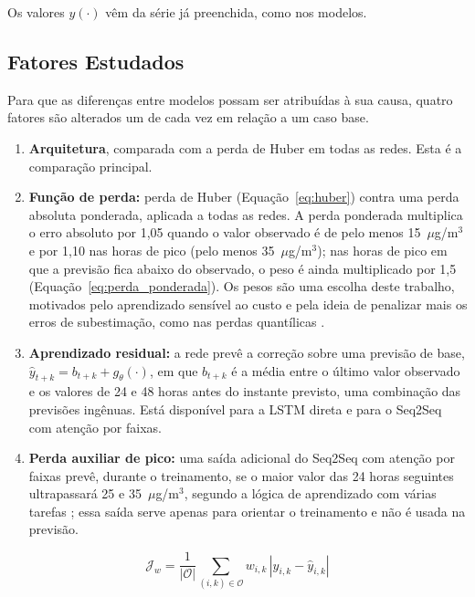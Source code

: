 Os valores \(y(\cdot)\) vêm da série já preenchida, como nos modelos.

\subsection{Fatores Estudados}
\label{sec:fatores}

Para que as diferenças entre modelos possam ser atribuídas à sua causa, quatro fatores são alterados um de cada vez em relação a um caso base.

\begin{enumerate}
    \item \textbf{Arquitetura}, comparada com a perda de Huber em todas as redes. Esta é a comparação principal.
    \item \textbf{Função de perda:} perda de Huber (Equação~\ref{eq:huber}) contra uma perda absoluta ponderada, aplicada a todas as redes. A perda ponderada multiplica o erro absoluto por 1,05 quando o valor observado é de pelo menos 15~\(\mu\)g/m\(^3\) e por 1,10 nas horas de pico (pelo menos 35~\(\mu\)g/m\(^3\)); nas horas de pico em que a previsão fica abaixo do observado, o peso é ainda multiplicado por 1,5 (Equação~\ref{eq:perda_ponderada}). Os pesos são uma escolha deste trabalho, motivados pelo aprendizado sensível ao custo \cite{elkan2001foundations} e pela ideia de penalizar mais os erros de subestimação, como nas perdas quantílicas \cite{koenker1978regression}.
    \item \textbf{Aprendizado residual:} a rede prevê a correção sobre uma previsão de base, \(\hat{y}_{t+k}=b_{t+k}+g_{\theta}(\cdot)\), em que \(b_{t+k}\) é a média entre o último valor observado e os valores de 24 e 48 horas antes do instante previsto, uma combinação das previsões ingênuas. Está disponível para a LSTM direta e para o Seq2Seq com atenção por faixas.
    \item \textbf{Perda auxiliar de pico:} uma saída adicional do Seq2Seq com atenção por faixas prevê, durante o treinamento, se o maior valor das 24 horas seguintes ultrapassará 25 e 35~\(\mu\)g/m\(^3\), segundo a lógica de aprendizado com várias tarefas \cite{caruana1997multitask}; essa saída serve apenas para orientar o treinamento e não é usada na previsão.
\end{enumerate}

\begin{equation}
    \mathcal{J}_{w}
    =
    \frac{1}{|\mathcal{O}|}\sum_{(i,k)\in\mathcal{O}}w_{i,k}\,|y_{i,k}-\hat{y}_{i,k}|
    \label{eq:perda_ponderada}
\end{equation}

